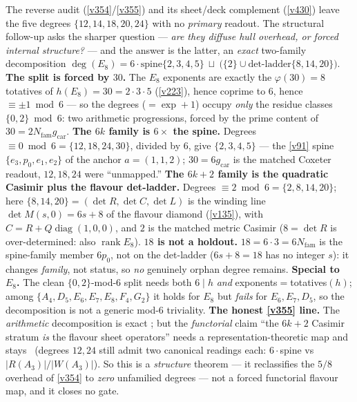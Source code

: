 \documentclass[11pt,a4paper]{article}
\newcommand{\Nfam}{N_{\mathrm{fam}}}
\newcommand{\gcar}{g_{\mathrm{car}}}
\begin{document}
\begin{winbox}
The reverse audit (\vref{v354}/\vref{v355}) and its sheet/deck complement (\vref{v430}) leave the five degrees $\{12,14,18,20,24\}$ with no \emph{primary} readout. The structural follow-up asks the sharper question --- \emph{are they diffuse hull overhead, or forced internal structure?} --- and the answer is the latter, an \emph{exact} two-family decomposition $\deg(E_8) = 6\cdot\text{spine}\{2,3,4,5\}\ \sqcup\ \big(\{2\}\cup\text{det-ladder}\{8,14,20\}\big)$. \textbf{The split is forced by $30$.} The $E_8$ exponents are exactly the $\varphi(30)=8$ totatives of $h(E_8)=30=2{\cdot}3{\cdot}5$ (\vref{v223}), hence coprime to $6$, hence $\equiv\pm1\bmod 6$ --- so the degrees ($=\exp+1$) occupy \emph{only} the residue classes $\{0,2\}\bmod 6$: two arithmetic progressions, forced by the prime content of $30=2\Nfam\gcar$. \textbf{The $6k$ family is $6\times$ the spine.} Degrees $\equiv0\bmod6=\{12,18,24,30\}$, divided by $6$, give $\{2,3,4,5\}$ --- the \vref{v91} spine $\{e_3,p_0,e_1,e_2\}$ of the anchor $a=(1,1,2)$; $30=6\gcar$ is the matched Coxeter readout, $12,18,24$ were ``unmapped.'' \textbf{The $6k{+}2$ family is the quadratic Casimir plus the flavour det-ladder.} Degrees $\equiv2\bmod6=\{2,8,14,20\}$; here $\{8,14,20\}=(\det R,\det C,\det L)$ is the winding line $\det M(s,0)=6s+8$ of the flavour diamond (\vref{v135}), with $C=R+Q\operatorname{diag}(1,0,0)$, and $2$ is the matched metric Casimir ($8=\det R$ is over-determined: also $\operatorname{rank}E_8$). \textbf{$18$ is not a holdout.} $18=6{\cdot}3=6\Nfam$ is the spine-family member $6p_0$, not on the det-ladder ($6s+8=18$ has no integer $s$): it changes \emph{family}, not status, so \emph{no} genuinely orphan degree remains. \textbf{Special to $E_8$.} The clean $\{0,2\}$-mod-$6$ split needs both $6\mid h$ \emph{and} exponents$=$totatives$(h)$; among $\{A_4,D_5,E_6,E_7,E_8,F_4,G_2\}$ it holds for $E_8$ but \emph{fails} for $E_6,E_7,D_5$, so the decomposition is not a generic mod-$6$ triviality. \textbf{The honest \vref{v355} line.} The \emph{arithmetic} decomposition is exact \mE; but the \emph{functorial} claim ``the $6k{+}2$ Casimir stratum \emph{is} the flavour sheet operators'' needs a representation-theoretic map and stays \mC\ (degrees $12,24$ still admit two canonical readings each: $6\cdot$spine vs $|R(A_3)|/|W(A_3)|$). So this is a \emph{structure} theorem --- it reclassifies the $5/8$ overhead of \vref{v354} to \emph{zero} unfamilied degrees --- not a forced functorial flavour map, and it closes no gate.
\end{winbox}
\end{document}
